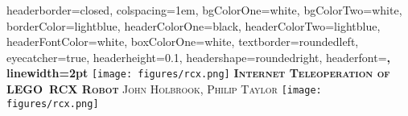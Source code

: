 \documentclass[landscape,a0paper,fontscale=0.285]{xebaposter} %
\begin{document}
\begin{poster}
{
headerborder=closed, %
colspacing=1em, %
bgColorOne=white, %
bgColorTwo=white, %
borderColor=lightblue, %
headerColorOne=black, %
headerColorTwo=lightblue, %
headerFontColor=white, %
boxColorOne=white, %
textborder=roundedleft, %
eyecatcher=true, %
headerheight=0.1\textheight, %
headershape=roundedright, %
headerfont=\Large\bf\textsc, %
linewidth=2pt %
}
%
{\texttt{[image: figures/rcx.png]}} %
{\bf\textsc{Internet Teleoperation of LEGO\textregistered \ RCX Robot}\vspace{0.5em}} %
{\textsc{John Holbrook, Philip Taylor}} %
{\texttt{[image: figures/rcx.png]} } %



\end{poster}
\end{document}
